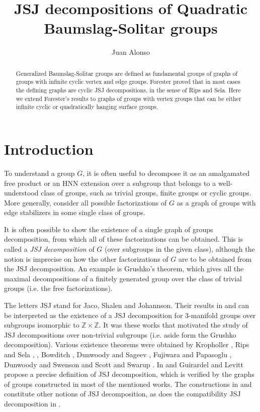 \documentclass[12pt]{amsart}
\title{JSJ decompositions of Quadratic Baumslag-Solitar groups}
\author{Juan Alonso}
\newcommand{\Z}{\mathbb{Z}}
\begin{document}
\maketitle

\begin{abstract}{Generalized Baumslag-Solitar groups are defined as  fundamental groups
of graphs of groups with infinite cyclic vertex and edge groups. Forester \cite{forester}
proved that in most cases the defining graphs are cyclic JSJ
decompositions, in the sense of Rips and Sela.  Here we extend
Forester's results to graphs of groups with vertex groups that can be
either infinite cyclic or quadratically hanging surface groups.}
\end{abstract}

\section{Introduction}


To understand a group $G$, it is often useful to decompose it as an amalgamated free product or an HNN extension over a subgroup that belongs to a well-understood class of groups, such as trivial groups, finite groups or cyclic groups. More generally, consider all possible factorizations of $G$ as a graph of groups with edge stabilizers in some single class of groups.

It is often possible to show the existence of a single graph of groups decomposition, from which all of these factorizations can be obtained. This is called a {\em JSJ decomposition} of $G$ (over subgroups in the given class), although the notion is imprecise on how the other factorizations of $G$ are to be obtained from the JSJ decomposition. An example is Grushko's theorem, which gives all the maximal decompositions of a finitely generated group over the class of trivial groups (i.e. the free factorizations).


The letters JSJ stand for Jaco, Shalen and Johannson. Their results in \cite{js} and \cite{jo} can be interpreted as the existence of a JSJ decomposition for $3$-manifold groups over subgroups isomorphic to $\Z\times\Z$. It was these works that motivated the study of JSJ decompositions over non-trivial subgroups (i.e. aside form the Grushko decomposition). Various existence theorems were obtained by Kropholler \cite{k}, Rips and Sela  \cite{sela}, \cite{ripsela}, Bowditch \cite{bow}, Dunwoody and Sageev \cite{dsa}, Fujiwara and Papasoglu \cite{fp}, Dunwoody and Swenson \cite{dsw} and Scott and Swarup \cite{ss}. In  \cite{gl0} and \cite{gl1} Guirardel and Levitt propose a precise definition of JSJ decomposition, which is verified by the graphs of groups constructed in most of the mentioned works. The constructions in \cite{dsw} and \cite{ss} constitute other notions of JSJ decomposition, as does the compatibility JSJ decomposition in \cite{gl2}.
\end{document}
